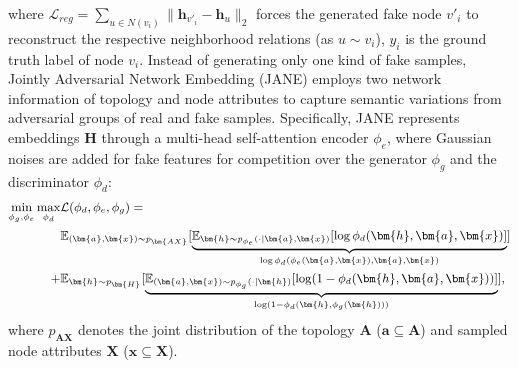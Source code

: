 where $\mathcal{L}_{reg} = \sum_{u \in N(v_{i})} \| \bm{h}_{v'_{i}} - \bm{h}_{u} \|_2$ forces the generated fake node $v'_{i}$ to reconstruct the respective neighborhood relations (as $u \sim v_{i}$), $y_{i}$ is the ground truth label of node $v_{i}$. 
Instead of generating only one kind of fake samples, Jointly Adversarial Network Embedding (JANE)  employs two network information of topology and node attributes to capture semantic variations from adversarial groups of real and fake samples. Specifically, JANE represents embeddings $\bm{H}$ through a multi-head self-attention encoder $\phi_e$, where Gaussian noises are added for fake features for competition over the generator $\phi_g$ and the discriminator $\phi_d$:
\begin{equation}
\small
\begin{aligned}
\min_{\phi_g,\phi_e} \max_{\phi_d} & {\mathcal{L} (\phi_d, \phi_e, \phi_g)}
= \\
&\mathbb{E}_{(\bm{a}, \bm{x}) \sim p_{\bm{AX}}}[\underbrace{\mathbb{E}_{\bm{h} \sim p_{\phi_e}(\cdot |\bm{a}, \bm{x})}[\log \phi_d(\bm{h}, \bm{a}, \bm{x})]}_{\log \phi_d(\phi_e(\bm{a}, \bm{x}), \bm{a}, \bm{x})}] \\
+& \mathbb{E}_{\bm{h} \sim p_{\bm{H}}}[\underbrace{\mathbb{E}_{(\bm{a}, \bm{x}) \sim p_{\phi_g}(\cdot |\bm{h})}[\log (1-\phi_d(\bm{h}, \bm{a}, \bm{x}))]}_{\log (1-\phi_d(\bm{h}, \phi_g(\bm{h})))}], 
\end{aligned}
\end{equation}
where $p_{\bm{AX}}$ denotes the joint distribution of the topology $\bm{A}$ ($\bm{a} \subseteq \bm{A}$) and sampled node attributes $\bm{X}$ ($\bm{x} \subseteq \bm{X}$).
